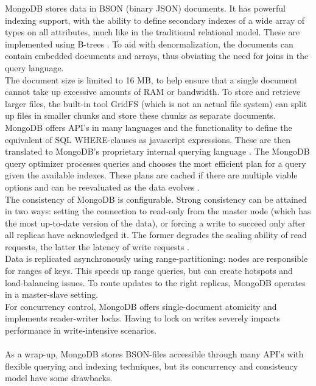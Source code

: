 \documentclass{IEEEtran}
\begin{document}
MongoDB stores data in BSON (binary JSON) documents. It has powerful indexing support, with the ability to define secondary indexes of a wide array of types on all attributes, much like in the traditional relational model. These are implemented using B-trees \cite{mongodb_indexes}. To aid with denormalization, the documents can contain embedded documents and arrays, thus obviating the need for joins in the query language.
\\The document size is limited to 16 MB, to help ensure that a single document cannot take up excessive amounts of RAM or bandwidth. To store and retrieve larger files, the built-in tool GridFS (which is not an actual file system) can split up files in smaller chunks and store these chunks as separate documents\cite{mongodb_gridfs}.
\\MongoDB offers API's in many languages and the functionality to define the equivalent of SQL WHERE-clauses as javascript expressions. These are then translated to MongoDB's proprietary internal querying language \cite{grolinger2013data}. The MongoDB query optimizer processes queries and chooses the most efficient plan for a query given the available indexes. These plans are cached if there are multiple viable options and can be reevaluated as the data evolves \cite{mongodb_query_plans}.
\\The consistency of MongoDB is configurable. Strong consistency can be attained in two ways: setting the connection to read-only from the master node (which has the most up-to-date version of the data), or forcing a write to succeed only after all replicas have acknowledged it. The former degrades the scaling ability of read requests, the latter the latency of write requests \cite{grolinger2013data}.
\\Data is replicated asynchronously using range-partitioning: nodes are responsible for ranges of keys. This speeds up range queries, but can create hotspots and load-balancing issues. To route updates to the right replicas, MongoDB operates in a master-slave setting.\\
For concurrency control, MongoDB offers single-document atomicity and implements reader-writer locks. Having to lock on writes severely impacts performance in write-intensive scenarios.
\\\\As a wrap-up, MongoDB stores BSON-files accessible through many API's with flexible querying and indexing techniques, but its concurrency and consistency model have some drawbacks.
\end{document}
